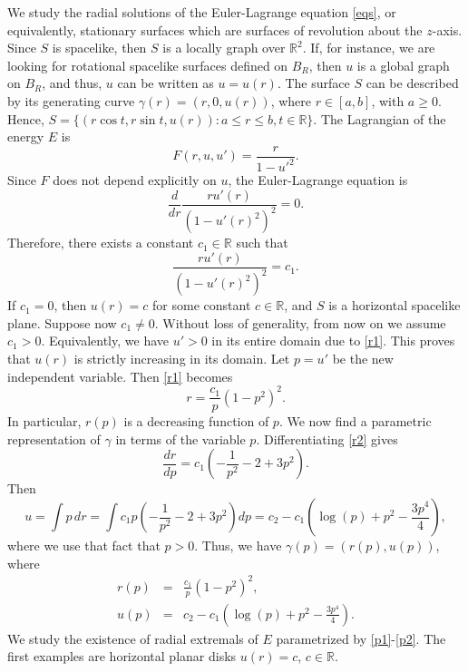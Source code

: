 \documentclass[10pt,a4paper]{amsart}
\def\r{\mathbb R}
\begin{document}
We study the radial solutions of the Euler-Lagrange equation \eqref{eqs}, or equivalently,   stationary surfaces  which are surfaces of revolution about the $z$-axis. Since $S$ is spacelike, then $S$ is a locally graph over $\r^2$. If, for instance, we are looking for rotational spacelike surfaces defined on $B_R$, then $u$ is a global graph on $B_R$, and thus, $u$ can be written as $u=u(r)$. The surface $S$   can be described by its generating curve $\gamma(r)=(r,0,u(r))$, where 
$r\in [a,b]$, with  $a\geq 0$. Hence, $S=\{(r\cos t, r\sin t,u(r))\colon a\leq r\leq b,t\in\r\}$. The Lagrangian of the energy $E$ is 
\begin{equation}\label{ff}
F(r,u,u')=\frac{r}{1-u'^2}.
\end{equation}
Since $F$ does not depend explicitly on $u$, the Euler-Lagrange equation is  
$$\frac{d}{dr}\frac{ru'(r)}{(1-u'(r)^2)^2}=0.$$
Therefore, there exists  a constant $c_1\in\r$ such that 
\begin{equation}\label{r1}
\frac{ru'(r)}{(1-u'(r)^2)^2}=c_1.
\end{equation}
 If $c_1=0$, then $u(r)=c$ for some constant $c\in\r$, and $S$ is a horizontal spacelike plane. Suppose now $c_1\not=0$. Without loss of generality, from now on we assume $c_1>0$.  Equivalently, we have $u'>0$ in its entire domain due to \eqref{r1}. This proves that $u(r)$ is strictly increasing in its domain. Let $p=u'$ be the new independent variable.   Then \eqref{r1} becomes
\begin{equation}\label{r2}
r= \frac{c_1}{p}(1-p^2)^2.
\end{equation}
In particular, $r(p)$ is a decreasing function of $p$. 
We now find a parametric representation of $\gamma$ in terms of the variable $p$. Differentiating   \eqref{r2} gives 
$$\frac{dr}{dp}=c_1 (-\frac{1}{p^2}-2+3p^2).$$
Then
$$u=\int p\, dr= \int c_1 p\left(-\frac{1}{p^2}-2+3p^2\right)dp=c_2- c_1 \left(\log(p)+p^2-\frac{3p^4}{4}\right),$$
where we use  that fact that $p>0$. 
Thus, we  have $\gamma(p)=(r(p),u(p))$, where 
\begin{eqnarray}
r(p)&=&\frac{c_1}{p}(1-p^2)^2,\label{p1}\\
u(p)&=&c_2-c_1\left(\log(p)+p^2-\frac{3p^4}{4}\right).\label{p2}
\end{eqnarray}
We study the existence of radial extremals of $E$ parametrized by \eqref{p1}-\eqref{p2}. The first examples are horizontal planar disks $u(r)=c$, $c\in\r$. 
\end{document}
